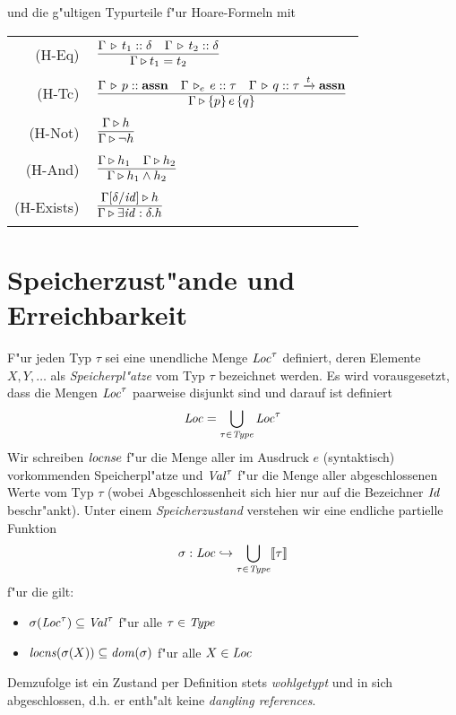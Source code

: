 \documentclass[12pt,a4paper,bigheadings]{scrartcl}
\newcommand{\semantic}[1]{\ensuremath{\llbracket#1\rrbracket}}
\newcommand{\assn}{\ensuremath{\mathbf{assn}}}
\newcommand{\locns}{\name{locns}}
\newcommand{\tto}{\ensuremath{\xrightarrow{t}}}
\newcommand{\RN}[1]{\mbox{{\sc (#1)}}}
\newcommand{\Tje}[3]{#1 \,\tr_e\, #2\cc#3}
\begin{document}
und die g"ultigen Typurteile f"ur Hoare-Formeln mit \\[3mm]
\begin{tabular}{rl}
  \RN{H-Eq} & $\regel{\Tj{\Gamma}{t_1}{\delta} \quad \Tj{\Gamma}{t_2}{\delta}}
                     {\Tjh{\Gamma}{t_1 = t_2}}$ \\[1mm]
  \RN{H-Tc} & $\regel{\Tj{\Gamma}{p}{\assn} \quad \Tje{\Gamma}{e}{\tau} \quad \Tj{\Gamma}{q}{\tau} \tto \assn}
                     {\Tjh{\Gamma}{\triple{p}{e}{q}}}$ \\[1mm]
  \RN{H-Not} & $\regel{\Tjh{\Gamma}{h}}
                      {\Tjh{\Gamma}{\neg h}}$ \\[1mm]
  \RN{H-And} & $\regel{\Tjh{\Gamma}{h_1} \quad \Tjh{\Gamma}{h_2}}
                      {\Tjh{\Gamma}{h_1 \wedge h_2}}$ \\[1mm]
  \RN{H-Exists} & $\regel{\Tjh{\Gamma[\delta/\id]}{h}}
                         {\Tjh{\Gamma}{\exists \id:\delta.h}}$
\end{tabular}


\section{Speicherzust"ande und Erreichbarkeit}

F"ur jeden Typ $\tau$ sei eine unendliche Menge ${\text{\it Loc\/}}^\tau$ definiert, deren Elemente $X,Y,\ldots$
als {\em Speicherpl"atze} vom Typ $\tau$ bezeichnet werden. Es wird vorausgesetzt, dass die Mengen
${\text{\it Loc\/}}^\tau$ paarweise disjunkt sind und darauf ist definiert
\[
  {\text{\it Loc\/}} = \bigcup_{\tau\in{\text{\it Type\/}}} {\text{\it Loc\/}}^\tau
\]
Wir schreiben $\locns{e}$ f"ur die Menge aller im Ausdruck $e$ (syntaktisch) vorkommenden Speicherpl"atze
und ${\text{\it Val\/}}^\tau$ f"ur die Menge aller abgeschlossenen Werte vom Typ $\tau$ (wobei Abgeschlossenheit sich
hier nur auf die Bezeichner ${\text{\it Id\/}}$ beschr"ankt). Unter einem {\em Speicherzustand} verstehen wir eine
endliche partielle Funktion
\[
  \sigma: \Loc \pto \bigcup_{\tau\in\Type} \semantic{\tau}
\]
f"ur die gilt:
\begin{itemize}
  \item $\sigma({\text{\it Loc\/}}^\tau) \subseteq {\text{\it Val\/}}^\tau$ f"ur alle $\tau\in{\text{\it Type\/}}$
  \item $\locns(\sigma(X)) \subseteq \dom{\sigma}$ f"ur alle $X\in{\text{\it Loc\/}}$
\end{itemize}
Demzufolge ist ein Zustand per Definition stets {\em wohlgetypt} und in sich abgeschlossen,
d.h. er enth"alt keine {\em dangling references}.
\end{document}

